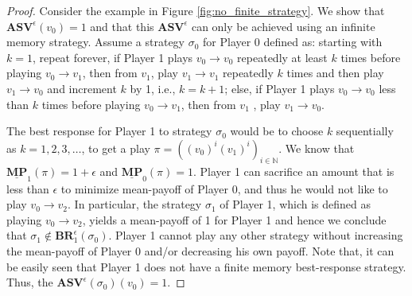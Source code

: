 \begin{proof}
Consider the example in Figure \ref{fig:no_finite_strategy}. We show that $\mathbf{ASV}^{\epsilon}(v_0) = 1$ and that this $\mathbf{ASV}^{\epsilon}$ can only be achieved using an infinite memory strategy. Assume a strategy $\sigma_0$ for Player 0 defined as: starting with $k=1$, repeat forever, if Player 1 plays $v_0 \to v_0$ repeatedly at least $k$ times before playing $v_0 \to v_1$, then from $v_1$, play $v_1 \to v_1$ repeatedly $k$ times and then play $v_1 \to v_0$ and increment $k$ by 1, i.e., $k=k+1$; else, if Player 1 plays $v_0 \to v_0$ less than $k$ times before playing $v_0 \to v_1$, then from $v_1$ , play $v_1 \to v_0$.

The best response for Player 1 to strategy $\sigma_0$ would be to choose $k$ sequentially as $k = 1, 2, 3, \dotsc$, to get a play $\pi = ((v_0)^i(v_1)^i)_{i \in \mathbb{N}}$. We know that $\underline{\mathbf{MP}}_1(\pi) = 1+\epsilon$ and $\underline{\mathbf{MP}}_0(\pi) = 1$. Player 1 can sacrifice an amount that is less than $\epsilon$ to minimize mean-payoff of Player 0, and thus he would not like to play $v_0 \to v_2$. In particular, the strategy $\sigma_1$ of Player 1, which is defined as playing $v_0 \to v_2$, yields a mean-payoff of 1 for Player 1 and hence we conclude that $\sigma_1 \notin \mathbf{BR}_1^{\epsilon}(\sigma_0)$. Player 1 cannot play any other strategy without increasing the mean-payoff of Player 0 and/or decreasing his own payoff. Note that, it can be easily seen that Player 1 does not have a finite memory best-response strategy. Thus, the $\mathbf{ASV}^{\epsilon}(\sigma_0)(v_0) = 1$.



\end{proof}
